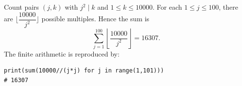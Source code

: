 Count pairs $(j,k)$ with $j^2\mid k$ and $1\le k\le10000$. For each $1\le j\le100$, there are $\lfloor\dfrac{10000}{j^2}\rfloor$ possible multiples. Hence the sum is
\[\sum_{j=1}^{100}\left\lfloor\dfrac{10000}{j^2}\right\rfloor=\boxed{16307}.\]
The finite arithmetic is reproduced by:
\begin{verbatim}
print(sum(10000//(j*j) for j in range(1,101)))
# 16307
\end{verbatim}
